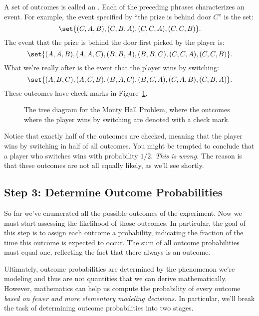 A set of outcomes is called an .  Each of the preceding
phrases characterizes an event.  For example, the event
specified by ``the prize is behind door $C$'' is the set:
%
\[
    \set{(C, A, B), (C, B, A), (C, C, A), (C, C, B)}.
\]
%
The event that the prize is behind the door first picked by the player is:
%
\[
    \set{(A, A, B), (A, A, C), (B, B, A), (B, B, C), (C, C, A), (C, C, B)}.
\]
%
What we're really after is the event that the player wins by
switching:
\begin{equation}
\set{(A, B, C), (A, C, B), (B, A, C), (B, C, A), (C, A, B), (C, B, A)}.\label{swwin-event}
\end{equation}
These outcomes have check marks in Figure~\ref{fig:14A4}.
\begin{figure}


\caption{The tree diagram for the Monty Hall Problem, where the
  outcomes where the player wins by switching are denoted with a
  check mark.}

\label{fig:14A4}

\end{figure}

Notice that exactly half of the outcomes are checked, meaning that the
player wins by switching in half of all outcomes.  You might be
tempted to conclude that a player who switches wins with probability
$1/2$.  \emph{This is wrong.}  The reason is that these outcomes are
not all equally likely, as we'll see shortly.

\subsection{Step 3: Determine Outcome Probabilities}

So far we've enumerated all the possible outcomes of the experiment.  Now
we must start assessing the likelihood of those outcomes.  In particular,
the goal of this step is to assign each outcome a probability, indicating
the fraction of the time this outcome is expected to occur.  The sum of
all outcome probabilities must equal one, reflecting the fact that there
always is an outcome.

Ultimately, outcome probabilities are determined by the phenomenon
we're modeling and thus are not quantities that we can derive
mathematically.  However, mathematics can help us compute the
probability of every outcome \emph{based on fewer and more
elementary modeling decisions.}  In particular, we'll break the task
of determining outcome probabilities into two stages.

